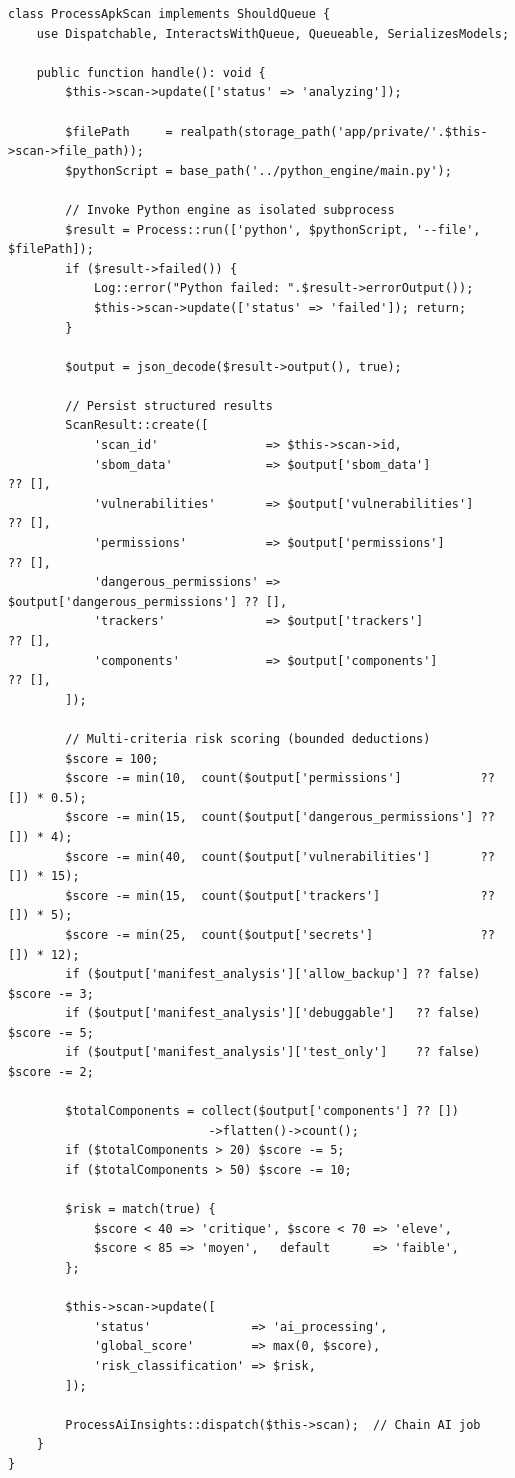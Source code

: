 \documentclass[3p,times]{elsarticle}
\begin{document}
\begin{lstlisting}[language=PHP2,
  caption={ProcessApkScan: Python invocation, JSON parsing, scoring, and AI job chaining},
  label={lst:apkscan}]
class ProcessApkScan implements ShouldQueue {
    use Dispatchable, InteractsWithQueue, Queueable, SerializesModels;

    public function handle(): void {
        $this->scan->update(['status' => 'analyzing']);

        $filePath     = realpath(storage_path('app/private/'.$this->scan->file_path));
        $pythonScript = base_path('../python_engine/main.py');

        // Invoke Python engine as isolated subprocess
        $result = Process::run(['python', $pythonScript, '--file', $filePath]);
        if ($result->failed()) {
            Log::error("Python failed: ".$result->errorOutput());
            $this->scan->update(['status' => 'failed']); return;
        }

        $output = json_decode($result->output(), true);

        // Persist structured results
        ScanResult::create([
            'scan_id'               => $this->scan->id,
            'sbom_data'             => $output['sbom_data']             ?? [],
            'vulnerabilities'       => $output['vulnerabilities']       ?? [],
            'permissions'           => $output['permissions']           ?? [],
            'dangerous_permissions' => $output['dangerous_permissions'] ?? [],
            'trackers'              => $output['trackers']              ?? [],
            'components'            => $output['components']            ?? [],
        ]);

        // Multi-criteria risk scoring (bounded deductions)
        $score = 100;
        $score -= min(10,  count($output['permissions']           ?? []) * 0.5);
        $score -= min(15,  count($output['dangerous_permissions'] ?? []) * 4);
        $score -= min(40,  count($output['vulnerabilities']       ?? []) * 15);
        $score -= min(15,  count($output['trackers']              ?? []) * 5);
        $score -= min(25,  count($output['secrets']               ?? []) * 12);
        if ($output['manifest_analysis']['allow_backup'] ?? false) $score -= 3;
        if ($output['manifest_analysis']['debuggable']   ?? false) $score -= 5;
        if ($output['manifest_analysis']['test_only']    ?? false) $score -= 2;

        $totalComponents = collect($output['components'] ?? [])
                            ->flatten()->count();
        if ($totalComponents > 20) $score -= 5;
        if ($totalComponents > 50) $score -= 10;

        $risk = match(true) {
            $score < 40 => 'critique', $score < 70 => 'eleve',
            $score < 85 => 'moyen',   default      => 'faible',
        };

        $this->scan->update([
            'status'              => 'ai_processing',
            'global_score'        => max(0, $score),
            'risk_classification' => $risk,
        ]);

        ProcessAiInsights::dispatch($this->scan);  // Chain AI job
    }
}
\end{lstlisting}
\end{document}
